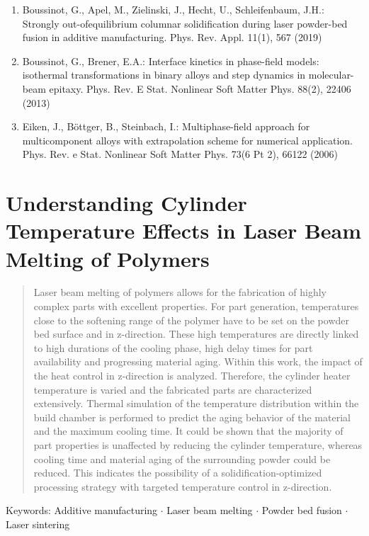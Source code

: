\documentclass[10pt]{article}
\begin{document}
\begin{enumerate}
  \item Boussinot, G., Apel, M., Zielinski, J., Hecht, U., Schleifenbaum, J.H.: Strongly out-ofequilibrium columnar solidification during laser powder-bed fusion in additive manufacturing. Phys. Rev. Appl. 11(1), 567 (2019)

  \item Boussinot, G., Brener, E.A.: Interface kinetics in phase-field models: isothermal transformations in binary alloys and step dynamics in molecular-beam epitaxy. Phys. Rev. E Stat. Nonlinear Soft Matter Phys. 88(2), 22406 (2013)

  \item Eiken, J., Böttger, B., Steinbach, I.: Multiphase-field approach for multicomponent alloys with extrapolation scheme for numerical application. Phys. Rev. e Stat. Nonlinear Soft Matter Phys. 73(6 Pt 2), 66122 (2006)

\end{enumerate}

\section*{Understanding Cylinder Temperature Effects in Laser Beam Melting of Polymers }


\begin{abstract}
Laser beam melting of polymers allows for the fabrication of highly complex parts with excellent properties. For part generation, temperatures close to the softening range of the polymer have to be set on the powder bed surface and in z-direction. These high temperatures are directly linked to high durations of the cooling phase, high delay times for part availability and progressing material aging. Within this work, the impact of the heat control in z-direction is analyzed. Therefore, the cylinder heater temperature is varied and the fabricated parts are characterized extensively. Thermal simulation of the temperature distribution within the build chamber is performed to predict the aging behavior of the material and the maximum cooling time. It could be shown that the majority of part properties is unaffected by reducing the cylinder temperature, whereas cooling time and material aging of the surrounding powder could be reduced. This indicates the possibility of a solidification-optimized processing strategy with targeted temperature control in z-direction.
\end{abstract}

Keywords: Additive manufacturing $\cdot$ Laser beam melting $\cdot$ Powder bed fusion $\cdot$ Laser sintering
\end{document}
